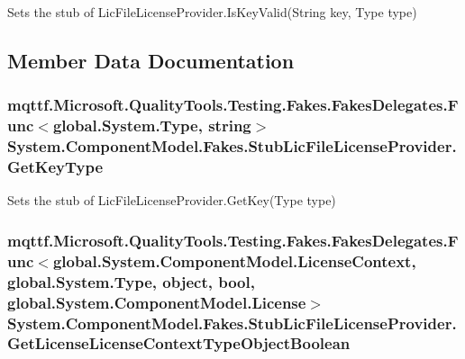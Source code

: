Sets the stub of Lic\-File\-License\-Provider.\-Is\-Key\-Valid(\-String key, Type type)



\subsection{Member Data Documentation}
\hypertarget{class_system_1_1_component_model_1_1_fakes_1_1_stub_lic_file_license_provider_af4be0014d5a393e0170e1bd2f771953e}{
\subsubsection[{Get\-Key\-Type}]{\setlength{\rightskip}{0pt plus 5cm}mqttf.\-Microsoft.\-Quality\-Tools.\-Testing.\-Fakes.\-Fakes\-Delegates.\-Func$<$global.\-System.\-Type, string$>$ System.\-Component\-Model.\-Fakes.\-Stub\-Lic\-File\-License\-Provider.\-Get\-Key\-Type}}\label{class_system_1_1_component_model_1_1_fakes_1_1_stub_lic_file_license_provider_af4be0014d5a393e0170e1bd2f771953e}


Sets the stub of Lic\-File\-License\-Provider.\-Get\-Key(\-Type type)

\hypertarget{class_system_1_1_component_model_1_1_fakes_1_1_stub_lic_file_license_provider_a5f40ab8e12f0622c653dd756618741dd}{
\subsubsection[{Get\-License\-License\-Context\-Type\-Object\-Boolean}]{\setlength{\rightskip}{0pt plus 5cm}mqttf.\-Microsoft.\-Quality\-Tools.\-Testing.\-Fakes.\-Fakes\-Delegates.\-Func$<$global.\-System.\-Component\-Model.\-License\-Context, global.\-System.\-Type, object, bool, global.\-System.\-Component\-Model.\-License$>$ System.\-Component\-Model.\-Fakes.\-Stub\-Lic\-File\-License\-Provider.\-Get\-License\-License\-Context\-Type\-Object\-Boolean}}\label{class_system_1_1_component_model_1_1_fakes_1_1_stub_lic_file_license_provider_a5f40ab8e12f0622c653dd756618741dd}


